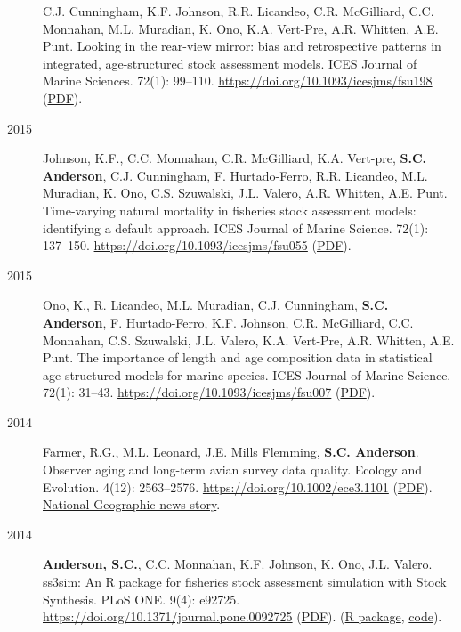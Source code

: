 \begin{description}
C.J. Cunningham, K.F. Johnson, R.R. Licandeo, C.R. McGilliard, C.C.
Monnahan, M.L. Muradian, K. Ono, K.A. Vert-Pre, A.R. Whitten, A.E. Punt.
Looking in the rear-view mirror: bias and retrospective patterns in
integrated, age-structured stock assessment models. ICES Journal of
Marine Sciences. 72(1): 99--110.
\url{https://doi.org/10.1093/icesjms/fsu198}
(\href{https://sean.updog.co/papers/Hurtado-Ferro_etal_2014_retrospective.pdf}{PDF}).
\item[2015]
Johnson, K.F., C.C. Monnahan, C.R. McGilliard, K.A. Vert-pre,
\textbf{S.C. Anderson}, C.J. Cunningham, F. Hurtado-Ferro, R.R.
Licandeo, M.L. Muradian, K. Ono, C.S. Szuwalski, J.L. Valero, A.R.
Whitten, A.E. Punt. Time-varying natural mortality in fisheries stock
assessment models: identifying a default approach. ICES Journal of
Marine Science. 72(1): 137--150.
\url{https://doi.org/10.1093/icesjms/fsu055}
(\href{http://icesjms.oxfordjournals.org/content/early/2014/04/09/icesjms.fsu055.full.pdf?keytype=ref&ijkey=NEXmZIkz3289u3z}{PDF}).
\item[2015]
Ono, K., R. Licandeo, M.L. Muradian, C.J. Cunningham, \textbf{S.C.
Anderson}, F. Hurtado-Ferro, K.F. Johnson, C.R. McGilliard, C.C.
Monnahan, C.S. Szuwalski, J.L. Valero, K.A. Vert-Pre, A.R. Whitten, A.E.
Punt. The importance of length and age composition data in statistical
age-structured models for marine species. ICES Journal of Marine
Science. 72(1): 31--43. \url{https://doi.org/10.1093/icesjms/fsu007}
(\href{http://icesjms.oxfordjournals.org/content/early/2014/02/20/icesjms.fsu007.full.pdf}{PDF}).
\item[2014]
Farmer, R.G., M.L. Leonard, J.E. Mills Flemming, \textbf{S.C. Anderson}.
Observer aging and long-term avian survey data quality. Ecology and
Evolution. 4(12): 2563--2576. \url{https://doi.org/10.1002/ece3.1101}
(\href{http://onlinelibrary.wiley.com/doi/10.1002/ece3.1101/pdf}{PDF}).
\href{http://news.nationalgeographic.com/news/2014/08/140805-aging-birders-breeding-bird-survey-volunteers-science/}{National
Geographic news story}.
\item[2014]
\textbf{Anderson, S.C.}, C.C. Monnahan, K.F. Johnson, K. Ono, J.L.
Valero. ss3sim: An R package for fisheries stock assessment simulation
with Stock Synthesis. PLoS ONE. 9(4): e92725.
\url{https://doi.org/10.1371/journal.pone.0092725}
(\href{http://www.plosone.org/article/fetchObject.action?uri=info\%3Adoi\%2F10.1371\%2Fjournal.pone.0092725&representation=PDF}{PDF}).
(\href{http://cran.r-project.org/web/packages/ss3sim/index.html}{R
package}, \href{https://github.com/ss3sim/ss3sim}{code}).

\end{description}
